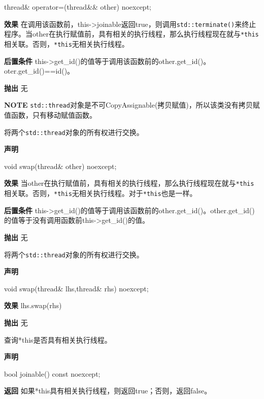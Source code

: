 \begin{cpp}
thread& operator=(thread&& other) noexcept;
\end{cpp}

\textbf{效果}
在调用该函数前，this->joinable返回true，则调用\texttt{std::terminate()}来终止程序。当other在执行赋值前，具有相关的执行线程，那么执行线程现在就与\texttt{*this}相关联。否则，\texttt{*this}无相关执行线程。

\textbf{后置条件}
this->get\_id()的值等于调用该函数前的other.get\_id()。oter.get\_id()==id()。

\textbf{抛出}
无

\textbf{NOTE} \texttt{std::thread}对象是不可CopyAssignable(拷贝赋值)，所以该类没有拷贝赋值函数，只有移动赋值函数。


将两个\texttt{std::thread}对象的所有权进行交换。

\textbf{声明}

\begin{cpp}
void swap(thread& other) noexcept;
\end{cpp}

\textbf{效果}
当other在执行赋值前，具有相关的执行线程，那么执行线程现在就与\texttt{*this}相关联。否则，\texttt{*this}无相关执行线程。对于\texttt{*this}也是一样。

\textbf{后置条件}
this->get\_id()的值等于调用该函数前的other.get\_id()。other.get\_id()的值等于没有调用函数前this->get\_id()的值。

\textbf{抛出}
无


将两个\texttt{std::thread}对象的所有权进行交换。

\textbf{声明}

\begin{cpp}
void swap(thread& lhs,thread& rhs) noexcept;
\end{cpp}

\textbf{效果}
lhs.swap(rhs)

\textbf{抛出}
无


查询*this是否具有相关执行线程。

\textbf{声明}

\begin{cpp}
bool joinable() const noexcept;
\end{cpp}

\textbf{返回}
如果*this具有相关执行线程，则返回true；否则，返回false。

